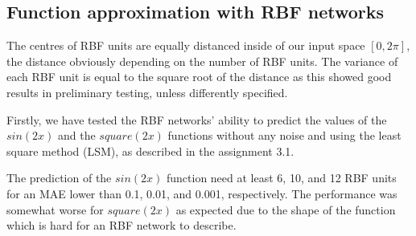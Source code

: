 \documentclass[a4paper]{article}
\begin{document}
\subsection{Function approximation with RBF networks}

The centres of RBF units are equally distanced inside of our input space $[0, 2\pi]$, the distance obviously depending on the number of RBF units. The variance of each RBF unit is equal to the square root of the distance as this showed good results in preliminary testing, unless differently specified.

Firstly, we have tested the RBF networks' ability to predict the values of the $sin(2x)$ and the $square(2x)$ functions without any noise and using the least square method (LSM), as described in the assignment 3.1.

The prediction of the $sin(2x)$ function need at least 6, 10, and 12 RBF units for an MAE lower than 0.1, 0.01, and 0.001, respectively. The performance was somewhat worse for $square(2x)$ as expected due to the shape of the function which is hard for an RBF network to describe.
\end{document}

